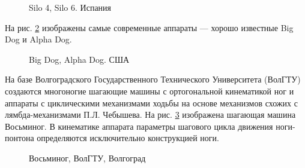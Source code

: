 \begin{figure}[h]
  \begin{minipage}[h]{0.49\linewidth}
  \end{minipage}
  \hfill
  \begin{minipage}[h]{0.49\linewidth}
  \end{minipage}
  \caption{Silo 4, Silo 6. Испания}
  \label{img:silo}
\end{figure}


На рис. \ref{img:bigdog} изображены самые современные аппараты --- хорошо известные Big Dog и Alpha Dog.

\clearpage

\begin{figure}[h]
  \begin{minipage}[h]{0.49\linewidth}
  \end{minipage}
  \hfill
  \begin{minipage}[h]{0.49\linewidth}
  \end{minipage}
  \caption{Big Dog, Alpha Dog. США}
  \label{img:bigdog}
\end{figure}

На базе Волгоградского Государственного Технического Университета (ВолГТУ) создаются многоногие шагающие машины с ортогональной кинематикой ног и аппараты с циклическими механизмами ходьбы на основе механизмов схожих с лямбда-механизмами П.Л. Чебышева. На рис. \ref{img:octonog} изображена шагающая машина Восьминог. В кинематике аппарата параметры шагового цикла движения ноги-понтона определяются исключительно конструкцией ноги. 

\begin{figure}[h]
  \begin{minipage}[h]{0.49\linewidth}
  \end{minipage}
  \hfill
  \begin{minipage}[h]{0.49\linewidth}
  \end{minipage}
  \caption{Восьминог, ВолГТУ, Волгоград}
  \label{img:octonog}
\end{figure}

